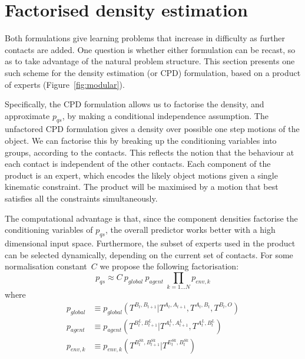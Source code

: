 

\section{Factorised density estimation}
\label{sec:Factors}

Both formulations give learning problems that increase in difficulty as further contacts are added. One question is whether either formulation can be recast, so as to take advantage of the natural
problem structure. This section presents one such scheme for the
density estimation (or CPD) formulation, based on a product of experts (Figure~\ref{fig:modular}).

Specifically, the CPD formulation allows us to factorise the density,
and approximate $p_{qs}$, by making a conditional independence
assumption. The unfactored CPD formulation gives a density over
possible one step motions of the object. We can
factorise this by breaking up the conditioning variables into groups,
according to the contacts. This reflects the notion that the behaviour
at each contact is independent of the other contacts. Each component of the product is an expert, which encodes the likely object motions given a single kinematic constraint. The product will be maximised by a motion that best satisfies all the constraints simultaneously.

The computational advantage is that, since the component
densities factorise the conditioning variables of $p_{qs}$, the overall predictor works better with a high dimensional input space.  Furthermore, the subset of experts used in the product can be selected dynamically, depending on the current set of contacts. For some normalisation constant~$C$ we propose the following factorisation:
\begin{equation}
p_{qs} \approx C\ p_{global}\ p_{agent}\ \mathop{\prod}_{k=1 \ldots N}{ p_{env,k}}
\label{eq:Learning.product}
\end{equation}
\noindent where
\begin{subequations}
\begin{align}
p_{global} &\equiv p_{global}(T^{B_{t}, B_{t+1}}|T^{A_{t}, A_{t+1}}, T^{A_t, B_t}, T^{B_t, O})
\label{eq:Learning.densityglobal} \\
p_{agent} &\equiv p_{agent}(T^{B^{L}_{t}, B^{L}_{t+1}}|T^{A^{L}_{t}, A^{L}_{t+1}}, T^{A^{L}_t, B^{L}_t})
\label{eq:Learning.densitylocal} \\
p_{env,k} &\equiv p_{env,k}(T^{B^{Sk}_t, B^{Sk}_{t+1}} | T^{E^{Sk}_t,B^{Sk}_t})
\label{eq:Learning.densityenv}
\end{align}
\end{subequations}

